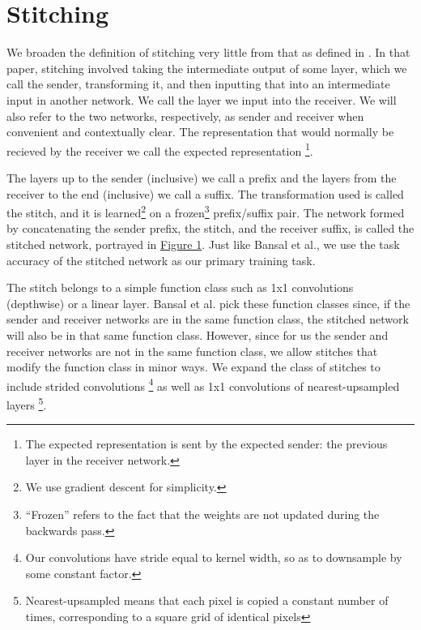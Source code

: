 \documentclass{article} %
\begin{document}
\section{Stitching}
\label{Stitching}
We broaden the definition of stitching very little from that as defined in \cite{Bansal2021RevisitingMS}. In that paper,
stitching involved taking the intermediate output of some layer, which we call the sender, transforming it, and then
inputting that into an intermediate input in another network. We call the layer we input into the receiver. We
will also refer to the two networks, respectively, as sender and receiver when convenient and contextually clear.
The representation that would normally be recieved by the receiver we call the expected representation
\footnote{The expected representation is sent by
the expected sender: the previous layer in the receiver network.}.

The layers up to the sender (inclusive) we call a prefix and the layers from the receiver to the end (inclusive) we call
a suffix. The transformation used is called the stitch, and it is learned\footnote{We use gradient descent for simplicity.}
on a frozen\footnote{``Frozen'' refers to the fact that the weights are not updated during the backwards pass.}
prefix/suffix pair. The network formed by concatenating the sender prefix, the stitch, and the receiver
suffix, is called the stitched network, portrayed in \hyperref[Figure1]{Figure 1}. Just like Bansal et al., we use the task accuracy of the stitched network as our
primary training task.

The stitch belongs to a simple function class such as 1x1 convolutions (depthwise) or
a linear layer. Bansal et al. pick these function classes since, if the sender and receiver networks are in the same
function class, the stitched network will also be in that same function class. However, since for us the sender and
receiver networks are not in the same function class, we allow stitches that modify the function class in minor ways.
We expand the class of stitches to include strided convolutions
\footnote{Our convolutions have stride equal to kernel width, so as to downsample
by some constant factor.} as well as 1x1 convolutions of nearest-upsampled layers
\footnote{Nearest-upsampled means that each pixel
is copied a constant number of times, corresponding to a square grid of identical pixels}.
\end{document}
